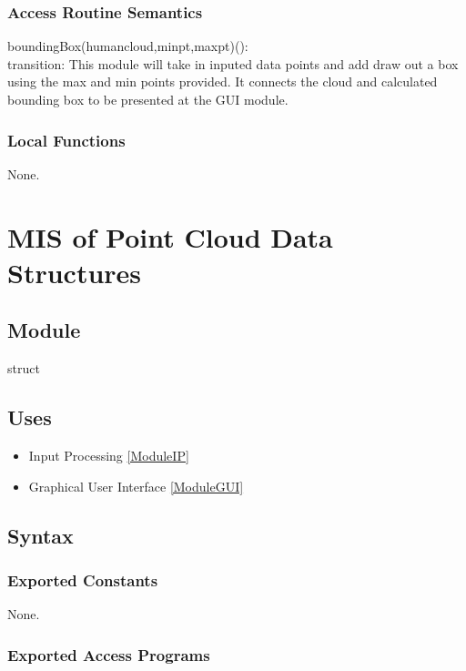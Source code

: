 \documentclass[12pt, titlepage]{article}
\begin{document}
\subsubsection{Access Routine Semantics}

\noindent boundingBox(humancloud,minpt,maxpt)():\\
transition: This module will take in inputed data points and add draw out a box using the max and min points provided. 
It connects the cloud and calculated bounding box to be presented at the GUI module.
\subsubsection{Local Functions}

None.
\newpage

\section{MIS of Point Cloud Data Structures} \label{ModulePCDS} 

\subsection{Module}

struct

\subsection{Uses}

\begin{itemize}
  \item Input Processing \ref{ModuleIP}
  \item Graphical User Interface \ref{ModuleGUI}
\end{itemize}

\subsection{Syntax}

\subsubsection{Exported Constants}

None.

\subsubsection{Exported Access Programs}
\end{document}
